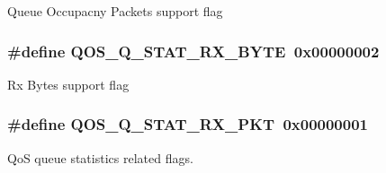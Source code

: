 Queue Occupacny Packets support flag \hypertarget{group__FAPI__QOS__QUEUE_ga1bc411916553d677f198bfe53a9d66e5}{
\subsubsection[{Q\-O\-S\-\_\-\-Q\-\_\-\-S\-T\-A\-T\-\_\-\-R\-X\-\_\-\-B\-Y\-T\-E}]{\setlength{\rightskip}{0pt plus 5cm}\#define Q\-O\-S\-\_\-\-Q\-\_\-\-S\-T\-A\-T\-\_\-\-R\-X\-\_\-\-B\-Y\-T\-E~0x00000002}}\label{group__FAPI__QOS__QUEUE_ga1bc411916553d677f198bfe53a9d66e5}
Rx Bytes support flag \hypertarget{group__FAPI__QOS__QUEUE_ga9a9a7fe4e0e98bd1a08c146a5ceea156}{
\subsubsection[{Q\-O\-S\-\_\-\-Q\-\_\-\-S\-T\-A\-T\-\_\-\-R\-X\-\_\-\-P\-K\-T}]{\setlength{\rightskip}{0pt plus 5cm}\#define Q\-O\-S\-\_\-\-Q\-\_\-\-S\-T\-A\-T\-\_\-\-R\-X\-\_\-\-P\-K\-T~0x00000001}}\label{group__FAPI__QOS__QUEUE_ga9a9a7fe4e0e98bd1a08c146a5ceea156}


Qo\-S queue statistics related flags. 

